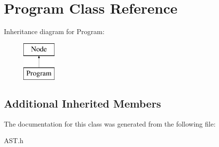 \hypertarget{classProgram}{\section{Program Class Reference}
\label{classProgram}
}
Inheritance diagram for Program\-:\begin{figure}[H]
\begin{center}
\leavevmode
\includegraphics[height=2.000000cm]{classProgram}
\end{center}
\end{figure}
\subsection*{Additional Inherited Members}


The documentation for this class was generated from the following file\-:\begin{DoxyCompactItemize}
\item 
A\-S\-T.\-h\end{DoxyCompactItemize}
